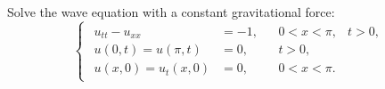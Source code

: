 \documentclass[plain]{pset}
\begin{document}
\pagebreak

\begin{problem}
Solve the wave equation with a constant gravitational force:
\[
    \begin{cases}
        \begin{aligned}
            u_{tt} - u_{xx}              & = -1, &  & 0 < x < \pi, & t > 0, \\
            u(0, t)          = u(\pi, t) & = 0,  &  & t > 0,                \\
            u(x, 0)          = u_t(x, 0) & = 0,  &  & 0 < x < \pi.
        \end{aligned}
    \end{cases}
\]
\end{problem}
\begin{solution}

\end{solution}
\end{document}
